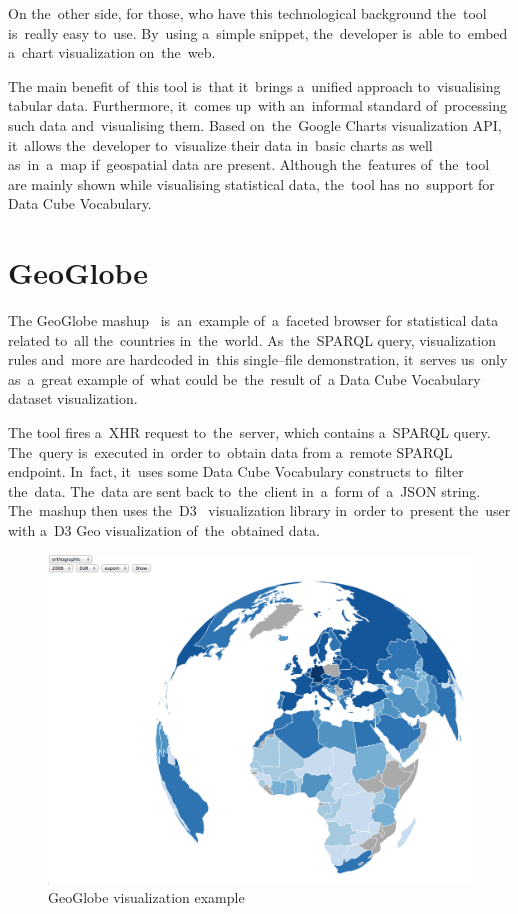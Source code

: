 On the~other side, for those, who have this technological background the~tool is~really easy to~use. By~using a~simple snippet, the~developer is~able to~embed a~chart visualization on~the~web.

The main benefit of~this tool is~that it~brings a~unified approach to~visualising tabular data. Furthermore, it~comes up~with an~informal standard of~processing such data and~visualising them. Based on~the~Google Charts visualization 
API, it~allows the~developer to~visualize their data in~basic charts 
as well as~in~a~map if~geospatial data are present. Although the~features of~the~tool are mainly shown while visualising statistical data, the~tool has no~support for 
Data Cube Vocabulary.

\section{GeoGlobe}
The GeoGlobe mashup~\cite{geoglobe} is~an~example of~a~faceted browser for 
statistical data related to~all the~countries in~the~world. As~the~SPARQL 
query, visualization rules and~more are hardcoded in~this single--file 
demonstration, it~serves us~only as~a~great example of~what could be~the~result of~a
Data Cube Vocabulary dataset visualization.

The tool fires a~XHR request to~the~server, which contains a~SPARQL query. The~query is~executed in~order to~obtain data from a~remote SPARQL endpoint. In~fact, it~uses some Data Cube Vocabulary constructs to~filter the~data. The~data 
are sent back to~the~client in~a~form of~a~JSON string. The~mashup then uses the~D3~\cite{d3} visualization library in~order to~present the~user with a~D3 Geo 
visualization of~the~obtained data.

\begin{figure}
	\centering
	\includegraphics[width=140mm]{img/geoglobe.png}
	\caption{GeoGlobe visualization example}
	\label{fig:geoglobe}
\end{figure}


